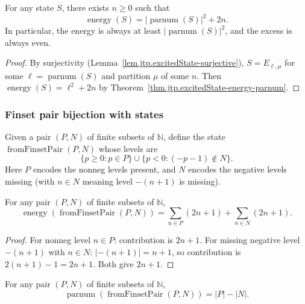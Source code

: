 \begin{lemma}
\label{lem.jtp.energy-eq-parnum-sq-add-even}
\leanhelper
\leanok
For any state $S$, there exists $n\geq 0$ such that
\[
\operatorname{energy}(S) = |\operatorname{parnum}(S)|^2 + 2n.
\]
In particular, the energy is always at least $|\operatorname{parnum}(S)|^2$,
and the excess is always even.
\end{lemma}

\begin{proof}
By surjectivity (Lemma~\ref{lem.jtp.excitedState-surjective}),
$S = E_{\ell,\mu}$ for some $\ell = \operatorname{parnum}(S)$ and partition $\mu$ of some $n$.
Then $\operatorname{energy}(S) = \ell^2 + 2n$ by Theorem~\ref{thm.jtp.excitedState-energy-parnum}.
\end{proof}

\subsubsection{Finset pair bijection with states}

\begin{definition}
\label{def.jtp.fromFinsetPair}
\leanhelper
\leanok
Given a pair $(P, N)$ of finite subsets of $\mathbb{N}$, define the state
$\operatorname{fromFinsetPair}(P, N)$ whose levels are
\[
\{p\geq 0 : p \in P\} \cup \{p < 0 : (-p-1) \notin N\}.
\]
Here $P$ encodes the nonneg levels present, and $N$ encodes the
negative levels missing (with $n \in N$ meaning level $-(n+1)$ is missing).
\end{definition}

\begin{lemma}
\label{lem.jtp.fromFinsetPair-energy}
\leanhelper
\leanok
For any pair $(P, N)$ of finite subsets of $\mathbb{N}$,
\[
\operatorname{energy}(\operatorname{fromFinsetPair}(P,N))
= \sum_{n\in P}(2n+1) + \sum_{n\in N}(2n+1).
\]
\end{lemma}

\begin{proof}
For nonneg level $n\in P$: contribution is $2n+1$. For missing negative level $-(n+1)$
with $n\in N$: $|{-}(n{+}1)| = n+1$, so contribution is $2(n+1)-1 = 2n+1$. Both give $2n+1$.
\end{proof}

\begin{lemma}
\label{lem.jtp.fromFinsetPair-parnum}
\leanhelper
\leanok
For any pair $(P, N)$ of finite subsets of $\mathbb{N}$,
\[
\operatorname{parnum}(\operatorname{fromFinsetPair}(P,N)) = |P| - |N|.
\]
\end{lemma}

